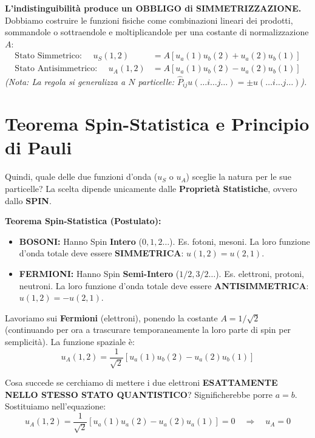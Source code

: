 \documentclass[11pt, a4paper]{article}
\begin{document}
\textbf{L'indistinguibilità produce un OBBLIGO di SIMMETRIZZAZIONE.} Dobbiamo costruire le funzioni fisiche come combinazioni lineari dei prodotti, sommandole o sottraendole e moltiplicandole per una costante di normalizzazione $A$: %
\begin{align}
    \text{Stato Simmetrico: } \quad u_S(1,2) &= A \left[ u_a(1)u_b(2) + u_a(2)u_b(1) \right] \\ %
    \text{Stato Antisimmetrico: } \quad u_A(1,2) &= A \left[ u_a(1)u_b(2) - u_a(2)u_b(1) \right] %
\end{align}
\textit{(Nota: La regola si generalizza a $N$ particelle: $\hat{P}_{ij} u(\dots i \dots j \dots) = \pm u(\dots i \dots j \dots)$).} %

\section{Teorema Spin-Statistica e Principio di Pauli} %

Quindi, quale delle due funzioni d'onda ($u_S$ o $u_A$) sceglie la natura per le sue particelle? La scelta dipende unicamente dalle \textbf{Proprietà Statistiche}, ovvero dallo \textbf{SPIN}. %

\textbf{Teorema Spin-Statistica (Postulato):} %
\begin{itemize}
    \item \textbf{BOSONI:} Hanno Spin \textbf{Intero} ($0, 1, 2 \dots$). Es. fotoni, mesoni. La loro funzione d'onda totale deve essere \textbf{SIMMETRICA}: $u(1,2) = u(2,1)$. %
    \item \textbf{FERMIONI:} Hanno Spin \textbf{Semi-Intero} ($1/2, 3/2 \dots$). Es. elettroni, protoni, neutroni. La loro funzione d'onda totale deve essere \textbf{ANTISIMMETRICA}: $u(1,2) = -u(2,1)$. %
\end{itemize}

\noindent
Lavoriamo sui \textbf{Fermioni} (elettroni), ponendo la costante $A = 1/\sqrt{2}$ (continuando per ora a trascurare temporaneamente la loro parte di spin per semplicità). La funzione spaziale è: %
\begin{equation*}
    u_A(1,2) = \frac{1}{\sqrt{2}} \left[ u_a(1)u_b(2) - u_a(2)u_b(1) \right] %
\end{equation*}

\noindent
Cosa succede se cerchiamo di mettere i due elettroni \textbf{ESATTAMENTE NELLO STESSO STATO QUANTISTICO}? %
Significherebbe porre $a = b$. Sostituiamo nell'equazione: %
\begin{equation*}
    u_A(1,2) = \frac{1}{\sqrt{2}} \left[ u_a(1)u_a(2) - u_a(2)u_a(1) \right] = 0 \quad \Rightarrow \quad \boxed{ u_A = 0 } %
\end{equation*}
    
\end{document}
